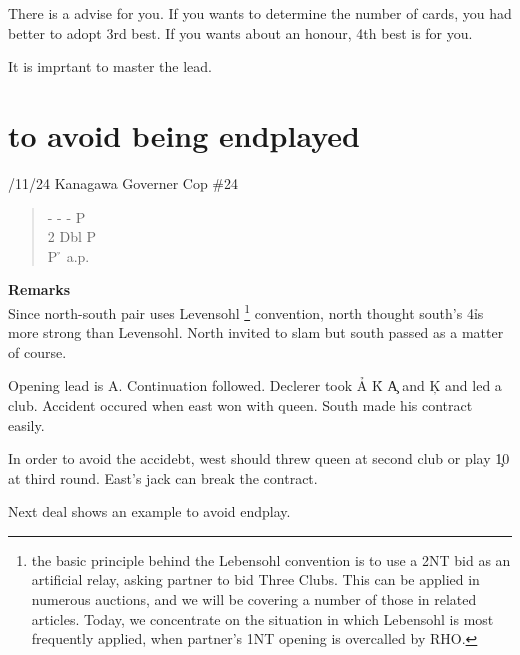 There is a advise for you. If you wants to determine
the number of cards, you had better to adopt 3rd best.
If you wants about an honour, 4th best is for you.

It is imprtant to master the lead.

\section {to avoid being endplayed}
/11/24 Kanagawa Governer Cop \#24
\begin{quote}
%
  {}%
  {}
  {}%
  {}%
\end{quote}
\begin{quote}
\begin{bidding}
- \> -  \> - \> P \\
2\s \> Dbl \> P \h\\
P \h \> a.p.
\end{bidding}
\end{quote}
{\bf Remarks}\\

Since north-south pair uses Levensohl
\footnote{
the basic principle behind the Lebensohl convention is to use a 2NT bid as an artificial relay, asking partner to bid Three Clubs. This can be applied in numerous auctions, and we will be covering a number of those in related articles.
Today, we concentrate on the situation in which Lebensohl is most frequently
applied, when partner's 1NT opening is overcalled by RHO.
} convention,
north thought south's 4\h is more strong than 
Levensohl. North invited to slam but
south passed as a matter of course.

Opening lead is \s A. Continuation followed.
Declerer took \h A \h K \c A and \c K and led a club.
Accident occured when east won with queen.
South made his contract easily.

In order to avoid the accidebt, west should threw queen at
second club or play \c 10 at third round. East's jack
can break the contract.


Next deal shows an example to avoid endplay.

